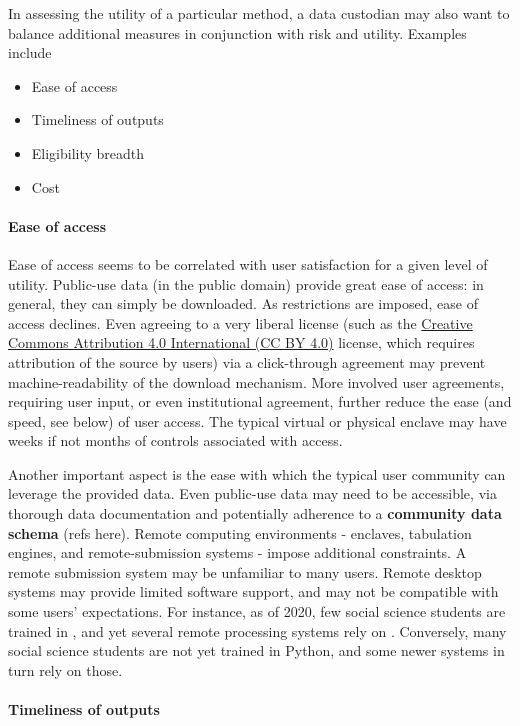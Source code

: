 In assessing the utility of a particular method, a data custodian may also want to balance additional measures in conjunction with risk and utility. Examples include

\begin{itemize}
    \item Ease of access
    \item Timeliness of outputs
    \item Eligibility breadth
    \item Cost
\end{itemize}

\paragraph{Ease of access}

Ease of access seems to be correlated with user satisfaction for a given level of utility. Public-use data (in the public domain) provide great ease of access: in general, they can simply be downloaded. As restrictions are imposed, ease of access declines. Even agreeing to a very liberal license (such as the \href{https://creativecommons.org/licenses/by/4.0/}{Creative Commons Attribution 4.0 International (CC BY 4.0)} license, which requires attribution of the source by users) via a click-through agreement may prevent machine-readability of the download mechanism. More involved user agreements, requiring user input, or even institutional agreement, further reduce the ease (and speed, see below) of user access. The typical virtual or physical enclave may have weeks if not months of controls associated with access. 

Another important aspect is the ease with which the typical user community can leverage the provided data. Even public-use data may need to be accessible, via thorough data documentation and potentially adherence to a \textbf{community data schema} (refs here). Remote computing environments - enclaves, tabulation engines, and remote-submission systems - impose additional constraints. A remote submission system may be unfamiliar to many users. Remote desktop systems may provide limited software support, and may not be compatible with some users' expectations. For instance, as of 2020, few social science students are trained in \SAS{}, and yet several remote processing systems rely on \SAS{}. Conversely, many social science students are not yet trained in Python, and some newer systems in turn rely on those. 

\paragraph{Timeliness of outputs}

